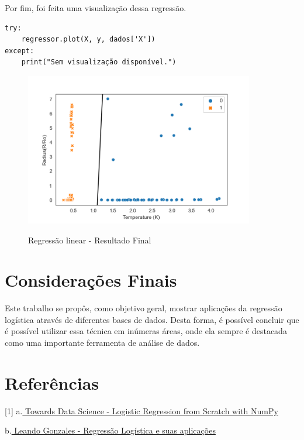 \documentclass[12pt]{article}
\begin{document}
\vspace{240px}

Por fim, foi feita uma visualização dessa regressão.
\\
\begin{lstlisting}
try:
    regressor.plot(X, y, dados['X'])
except:
    print("Sem visualização disponível.")
\end{lstlisting}

\begin{figure}[h]
\caption{Regressão linear - Resultado Final}
\centering
\includegraphics[width=10cm]{teste.png}
\label{figura:regressao_linear}
\end{figure}


\newpage
\section{Considerações Finais}

\hspace{0.4cm}Este trabalho se propôs, como objetivo geral, mostrar aplicações da regressão logística através de diferentes bases de dados. Desta forma, é possível concluir que é possível utilizar essa técnica em inúmeras áreas, onde ela sempre é destacada como uma importante ferramenta de análise de dados. 

\newpage
\section{Referências}

[1] a.\href{https://towardsdatascience.com/logistic-regression-from-scratch-with-numpy-da4cc3121ece}{ Towards Data Science - Logistic Regression from Scratch with NumPy}

\noindent [2] b.\href{https://monografias.ufma.br/jspui/bitstream/123456789/3572/1/LEANDRO-GONZALEZ.pdf}{ Leando Gonzales - Regressão Logística e suas aplicações}
\end{document}

